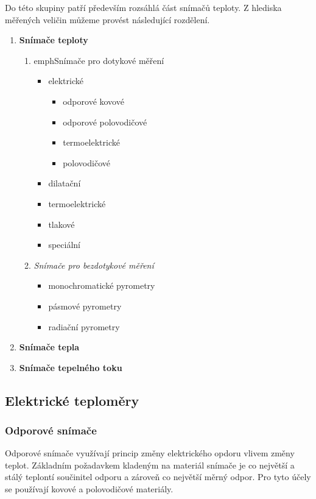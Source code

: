     Do této skupiny patří především rozsáhlá část snímačů teploty. Z hlediska měřených veličin
    můžeme provést následující rozdělení.
    \begin{enumerate}[noitemsep]
      \item \textbf{Snímače teploty}
        \begin{enumerate}[label=\emph{\alph*}),noitemsep]
          \item emph{Snímače pro dotykové měření} 
            \begin{itemize}
              \item elektrické
               \begin{itemize}
                 \item odporové kovové
                 \item odporové polovodičové
                 \item termoelektrické
                 \item polovodičové 
               \end{itemize}   
              \item dilatační
              \item termoelektrické
              \item tlakové
              \item speciální
            \end{itemize}
          \item \emph{Snímače pro bezdotykové měření}
            \begin{itemize}
              \item monochromatické pyrometry
              \item pásmové pyrometry
              \item radiační pyrometry
            \end{itemize}
        \end{enumerate}
      \item \textbf{Snímače tepla}
      \item \textbf{Snímače tepelného toku}
    \end{enumerate}  
       
    \subsection{Elektrické teploměry}
      \subsubsection{Odporové snímače}
        Odporové snímače využívají princip změny elektrického opdoru vlivem změny teplot. Základním
        požadavkem kladeným na materiál snímače je co největší a stálý teplontí součinitel odporu a
        zároveň co největší měrný odpor. Pro tyto účely se používají kovové a polovodičové
        materiály.
        
